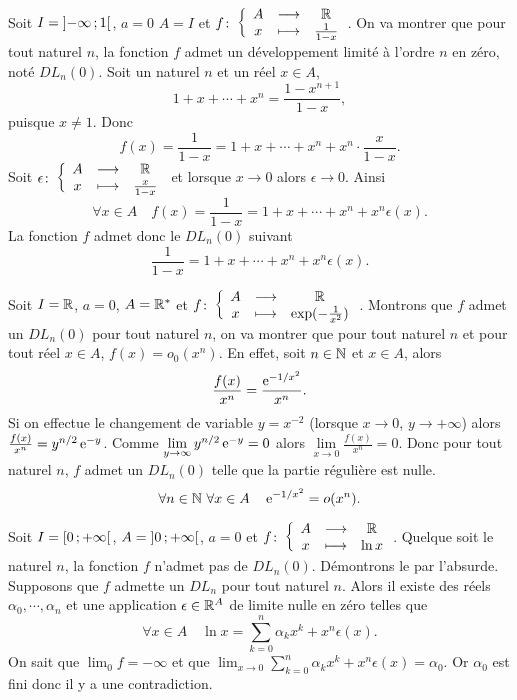 Soit \(I=\left] -\infty \, ;  1 \right[\), \(a=0\) \(A=I\) et \(f\colon \left\{\begin{array}{ccc} A & \longrightarrow &\mathbb{R}\\ x & \longmapsto & \frac{1}{1-x} \end{array} \right.\). On va montrer que pour tout naturel \(n\), la fonction \(f\) admet un développement limité à l'ordre \(n\) en zéro, noté \(DL_n(0)\). Soit un naturel \(n\) et un réel \(x \in A\),
\begin{equation}
  1+x+ \dotsb + x^n = \frac{1-x^{n+1}}{1-x},
\end{equation}
puisque \(x \neq 1\). Donc
\begin{equation}
  f(x) = \frac{1}{1-x}=1+x+ \dotsb + x^n + x^n \cdot \frac{x}{1-x}.
\end{equation}
Soit \(\epsilon\colon \left\{\begin{array}{ccc} A & \longrightarrow &\mathbb{R}\\ x & \longmapsto & \frac{x}{1-x} \end{array} \right.\) et lorsque \(x \to 0\) alors \(\epsilon \to 0\). Ainsi
\begin{equation}
  \forall x \in A \quad f(x) = \frac{1}{1-x}=1+x+ \dotsb + x^n + x^n \epsilon(x).
\end{equation}
La fonction \(f\) admet donc le \(DL_n(0)\) suivant
\begin{equation}
  \frac{1}{1-x} = 1+x+ \dotsb + x^n + x^n \epsilon(x).
\end{equation}

Soit \(I=\mathbb{R}\), \(a=0\), \(A=\mathbb{R}^*\) et \(f\colon \left\{\begin{array}{ccc} A & \longrightarrow &\mathbb{R}\\ x & \longmapsto & \exp(-\frac{1}{x^2}) \end{array} \right.\). Montrons que \(f\) admet un \(DL_n(0)\) pour tout naturel \(n\), on va montrer que pour tout naturel \(n\) et pour tout réel \(x \in A\), \(f(x)=o_0(x^n)\). En effet, soit \(n \in \mathbb{N}\) et \(x \in A\), alors
\begin{equation}
  \frac{f(x)}{x^n}=\frac{\operatorname{e}^{-1/x^2}}{x^n}.
\end{equation}
Si on effectue le changement de variable \(y=x^{-2}\) (lorsque \(x \to 0\), \(y \to + \infty\)) alors \(\frac{f(x)}{x^n}=y^{n/2}\operatorname{e}^{-y}\). Comme \(\lim\limits_{y \to \infty} y^{n/2}\operatorname{e}^{-y} =0\) alors \(\lim\limits_{x \to 0} \frac{f(x)}{x^n} =0\). Donc pour tout naturel \(n\), \(f\) admet un \(DL_n(0)\) telle que la partie régulière est nulle.
\begin{equation}
  \forall n \in \mathbb{N} \ \forall x \in A \quad \operatorname{e}^{-1/x^2}=o(x^n).
\end{equation}

Soit \(I=\left[ 0 \, ;  +\infty \right[\), \(A=\left] 0 \, ;  +\infty \right[\), \(a=0\) et \(f\colon \left\{\begin{array}{ccc} A & \longrightarrow &\mathbb{R}\\ x & \longmapsto & \ln x \end{array} \right.\). Quelque soit le naturel \(n\), la fonction \(f\) n'admet pas de \(DL_n(0)\). Démontrons le par l'absurde. Supposons que \(f\) admette un \(DL_n\) pour tout naturel \(n\). Alors il existe des réels \(\alpha_0, \cdots, \alpha_n\) et une application \(\epsilon \in \mathbb{R}^A\) de limite nulle en zéro telles que
\begin{equation}
  \forall x \in A \quad \ln x =\sum_{k=0}^n \alpha_k x^k + x^n\epsilon(x).
\end{equation}
On sait que \(\lim_0 f = -\infty\) et que \(\lim_{x \to 0} \sum_{k=0}^n \alpha_k x^k + x^n\epsilon(x) = \alpha_0\). Or \(\alpha_0\) est fini donc il y a une contradiction.

